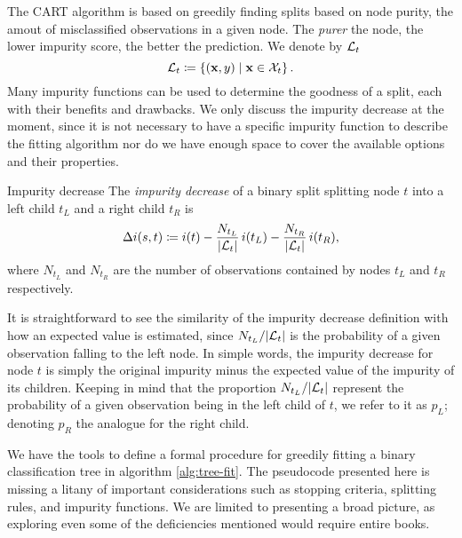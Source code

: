The CART algorithm is based on greedily finding splits based on node purity, the
amout of misclassified observations in a given node. The \textit{purer} the
node, the lower impurity score, the better the prediction. We denote by $\mathcal{L}_t$
\begin{equation*}
    \mathcal{L}_t \coloneqq \left\{ (\mathbf{x}, y) \mid \mathbf{x} \in \mathcal{X}_t \right\}.
\end{equation*}
Many impurity functions can be used to determine the goodness of a split, each
with their benefits and drawbacks. We only discuss the impurity decrease at the
moment, since it is not necessary to have a specific impurity function to
describe the fitting algorithm nor do we have enough space to cover the
available options and their properties.

\begin{dfn}{Impurity decrease}{}
    The \emph{impurity decrease} of a binary split splitting node $t$ into a
    left child $t_L$ and a right child $t_R$ is
    \begin{equation*}
        \Delta i(s, t) \coloneqq i(t) - \frac{N_{t_L}}{|\mathcal{L}_t|} \, i(t_L) - \frac{N_{t_R}}{|\mathcal{L}_t|} \, i(t_R),
    \end{equation*}
    where $N_{t_L}$ and $N_{t_R}$ are the number of observations contained by
    nodes $t_L$ and $t_R$ respectively.
\end{dfn}

It is straightforward to see the similarity of the impurity decrease definition
with how an expected value is estimated, since $N_{t_L} / |\mathcal{L}_t|$ is the
probability of a given observation falling to the left node. In simple words,
the impurity decrease for node $t$ is simply the original impurity minus the
expected value of the impurity of its children. Keeping in mind that the
proportion $N_{t_L} / |\mathcal{L}_t|$ represent the probability of a given observation
being in the left child of $t$, we refer to it as $p_L$; denoting $p_R$ the
analogue for the right child.

We have the tools to define a formal procedure for greedily fitting a binary
classification tree in algorithm \ref{alg:tree-fit}. The pseudocode presented
here is missing a litany of important considerations such as stopping criteria,
splitting rules, and impurity functions. We are limited to presenting a broad
picture, as exploring even some of the deficiencies mentioned would require
entire books.

